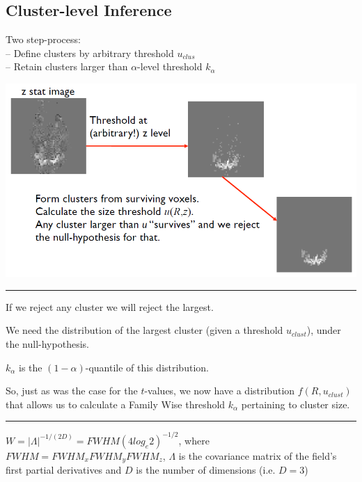 \documentclass[]{article}
\begin{document}
\subsection{Cluster-level Inference}\label{cluster-level-inference-2}

Two step-process:\\
-- Define clusters by arbitrary threshold \(u_{clus}\)\\
-- Retain clusters larger than \(\alpha\)-level threshold \(k_\alpha\)

\begin{center}\includegraphics[width=700px]{./figs/clust_cookbook} \end{center}

\begin{center}\rule{0.5\linewidth}{\linethickness}\end{center}

If we reject any cluster we will reject the largest.

We need the distribution of the largest cluster (given a threshold
\(u_{clust}\)), under the null-hypothesis.

\(k_\alpha\) is the \((1-\alpha)\)-quantile of this distribution.

So, just as was the case for the \(t\)-values, we now have a
distribution \(f(R,u_{clust})\) that allows us to calculate a Family
Wise threshold \(k_\alpha\) pertaining to cluster size.

\begin{center}\rule{0.5\linewidth}{\linethickness}\end{center}

\(W=|\Lambda|^{-1/(2D)}=FWHM (4 log_e 2)^{-1/2}\), where
\(FWHM=FWHM_xFWHM_yFWHM_z\), \(\Lambda\) is the covariance matrix of the
field's first partial derivatives and \(D\) is the number of dimensions
(i.e. \(D=3\))
\end{document}
